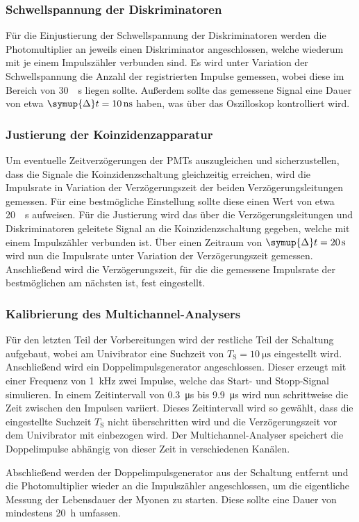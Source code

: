 \subsubsection{Schwellspannung der Diskriminatoren}

Für die Einjustierung der Schwellspannung der Diskriminatoren werden die Photomultiplier an jeweils einen Diskriminator angeschlossen,
welche wiederum mit je einem Impulszähler verbunden sind.
Es wird unter Variation der Schwellspannung die Anzahl der registrierten Impulse gemessen,
wobei diese im Bereich von \SI[per-mode=reciprocal]{30}{\per\second} liegen sollte.
Außerdem sollte das gemessene Signal eine Dauer von etwa $\symup{\Delta}t = \SI{10}{\nano\second}$ haben,
was über das Oszilloskop kontrolliert wird.


\subsubsection{Justierung der Koinzidenzapparatur}

Um eventuelle Zeitverzögerungen der \acp{PMT} auszugleichen und sicherzustellen,
dass die Signale die Koinzidenzschaltung gleichzeitig erreichen,
wird die Impulsrate in Variation der Verzögerungszeit der beiden Verzögerungsleitungen gemessen.
Für eine bestmögliche Einstellung sollte diese einen Wert von etwa \SI[per-mode=reciprocal]{20}{\per\second} aufweisen.
Für die Justierung wird das über die Verzögerungsleitungen und Diskriminatoren geleitete Signal an die Koinzidenzschaltung gegeben,
welche mit einem Impulszähler verbunden ist.
Über einen Zeitraum von $\symup{\Delta}t = \SI{20}{\second}$ wird nun die Impulsrate unter Variation der Verzögerungszeit gemessen.
Anschließend wird die Verzögerungszeit,
für die die gemessene Impulsrate der bestmöglichen am nächsten ist,
fest eingestellt.


\subsubsection{Kalibrierung des Multichannel-Analysers}

Für den letzten Teil der Vorbereitungen wird der restliche Teil der Schaltung aufgebaut,
wobei am Univibrator eine Suchzeit von $T_\text{S} = \SI{10}{\micro\second}$ eingestellt wird.
Anschließend wird ein Doppelimpulsgenerator angeschlossen.
Dieser erzeugt mit einer Frequenz von \SI{1}{\kilo\hertz} zwei Impulse,
welche das Start- und Stopp-Signal simulieren.
In einem Zeitintervall von \SI{0.3}{\micro\second} bis \SI{9.9}{\micro\second} wird nun schrittweise die Zeit zwischen den Impulsen variiert.
Dieses Zeitintervall wird so gewählt,
dass die eingestellte Suchzeit $T_\text{S}$ nicht überschritten wird und die Verzögerungszeit vor dem Univibrator mit einbezogen wird.
Der Multichannel-Analyser speichert die Doppelimpulse abhängig von dieser Zeit in verschiedenen Kanälen.

Abschließend werden der Doppelimpulsgenerator aus der Schaltung entfernt und die Photomultiplier wieder an die Impulszähler angeschlossen,
um die eigentliche Messung der Lebensdauer der Myonen zu starten.
Diese sollte eine Dauer von mindestens \SI{20}{\hour} umfassen.

